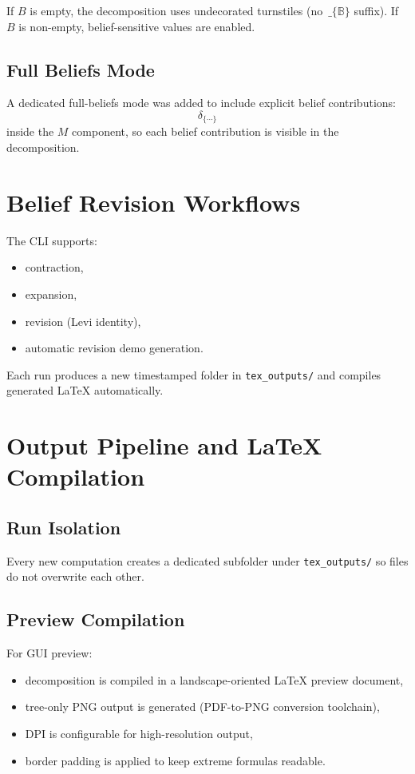 \documentclass[11pt,a4paper]{article}
\begin{document}
If $B$ is empty, the decomposition uses undecorated turnstiles (no $\,\_\{\mathbb{B}\}$ suffix). If $B$ is non-empty, belief-sensitive values are enabled.

\subsection{Full Beliefs Mode}
A dedicated full-beliefs mode was added to include explicit belief contributions:
\[
\delta_{\{\cdots\}}
\]
inside the $M$ component, so each belief contribution is visible in the decomposition.

\section{Belief Revision Workflows}
The CLI supports:
\begin{itemize}[leftmargin=1.5em]
  \item contraction,
  \item expansion,
  \item revision (Levi identity),
  \item automatic revision demo generation.
\end{itemize}

Each run produces a new timestamped folder in \texttt{tex\_outputs/} and compiles generated LaTeX automatically.

\section{Output Pipeline and LaTeX Compilation}
\subsection{Run Isolation}
Every new computation creates a dedicated subfolder under \texttt{tex\_outputs/} so files do not overwrite each other.

\subsection{Preview Compilation}
For GUI preview:
\begin{itemize}[leftmargin=1.5em]
  \item decomposition is compiled in a landscape-oriented LaTeX preview document,
  \item tree-only PNG output is generated (PDF-to-PNG conversion toolchain),
  \item DPI is configurable for high-resolution output,
  \item border padding is applied to keep extreme formulas readable.
\end{itemize}
\end{document}
